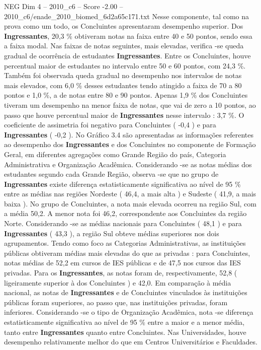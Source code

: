 \begin{textsample}{NEG Dim 4 – 2010\_c6 – Score -2.00 – 2010\_c6/enade\_2010\_biomed\_6d2a65c171.txt}
Nesse componente, tal como na prova como um todo, os Concluintes apresentaram desempenho superior.
Dos \textbf{Ingressantes}, 20,3 \% obtiveram notas na faixa entre 40 e 50 pontos, sendo essa a faixa modal.
Nas faixas de notas seguintes, mais elevadas, verifica -se queda gradual de ocorrência de estudantes \textbf{Ingressantes}.
Entre os Concluintes, houve percentual maior de estudantes no intervalo entre 50 e 60 pontos, com 24,3 \%.
Também foi observada queda gradual no desempenho nos intervalos de notas mais elevados, com 6,0 \% desses estudantes tendo atingido a faixa de 70 a 80 pontos e 1,0 \%, a de notas entre 80 e 90 pontos.
Apenas 1,9 \% dos Concluintes tiveram um desempenho na menor faixa de notas, que vai de zero a 10 pontos, ao passo que houve percentual maior de \textbf{Ingressantes} nesse intervalo : 3,7 \%.
O coeficiente de assimetria foi negativo para Concluintes ( -0,4 ) e para \textbf{Ingressantes} ( -0,2 ).
No Gráfico 3.4 são apresentadas as informações referentes ao desempenho dos \textbf{Ingressantes} e dos Concluintes no componente de Formação Geral, em diferentes agregações como Grande Região do país, Categoria Administrativa e Organização Acadêmica.
Considerando -se as notas médias dos estudantes segundo cada Grande Região, observa -se que no grupo de \textbf{Ingressantes} existe diferença estatisticamente significativa ao nível de 95 \% entre as médias nas regiões Nordeste ( 46,4, a mais alta ) e Sudeste ( 41,9, a mais baixa ).
No grupo de Concluintes, a nota mais elevada ocorreu na região Sul, com a média 50,2.
A menor nota foi 46,2, correspondente aos Concluintes da região Norte.
Considerando -se as médias nacionais para Concluintes ( 48,1 ) e para \textbf{Ingressantes} ( 43,3 ), a região Sul obteve médias superiores nos dois agrupamentos.
Tendo como foco as Categorias Administrativas, as instituições públicas obtiveram médias mais elevadas do que as privadas : para Concluintes, notas médias de 52,2 em cursos de IES públicas e de 47,5 nos cursos das IES privadas.
Para os \textbf{Ingressantes}, as notas foram de, respectivamente, 52,8 ( ligeiramente superior à dos Concluintes ) e 42,0.
Em comparação à média nacional, as notas de \textbf{Ingressantes} e de Concluintes vinculados às instituições públicas foram superiores, ao passo que, nas instituições privadas, foram inferiores.
Considerando -se o tipo de Organização Acadêmica, nota -se diferença estatisticamente significativa ao nível de 95 \% entre a maior e a menor média, tanto entre \textbf{Ingressantes} quanto entre Concluintes.
Nas Universidades, houve desempenho relativamente melhor do que em Centros Universitários e Faculdades.

\end{textsample}
